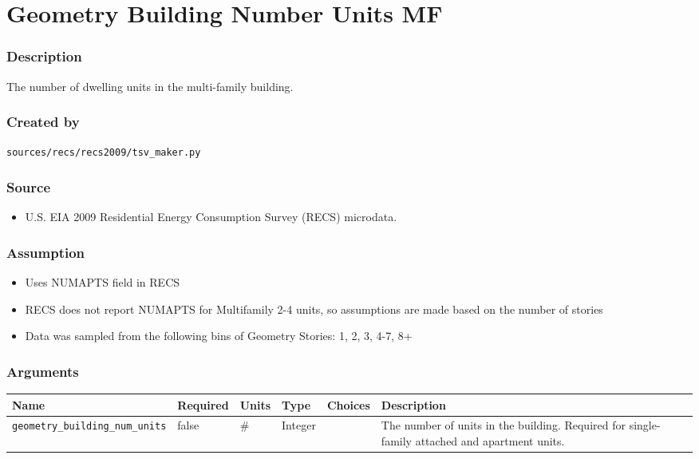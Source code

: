 \section{Geometry Building Number Units
MF}\label{geometry_building_number_units_mf}

\subsubsection{Description}\label{description-47}

The number of dwelling units in the multi-family building.

\subsubsection{Created by}\label{created-by-47}

\texttt{sources/recs/recs2009/tsv\_maker.py}

\subsubsection{Source}\label{source-46}

\begin{itemize}
 
\item
  U.S. EIA 2009 Residential Energy Consumption Survey (RECS) microdata.
\end{itemize}

\subsubsection{Assumption}\label{assumption-26}

\begin{itemize}
 
\item
  Uses NUMAPTS field in RECS
\item
  RECS does not report NUMAPTS for Multifamily 2-4 units, so assumptions
  are made based on the number of stories
\item
  Data was sampled from the following bins of Geometry Stories: 1, 2, 3,
  4-7, 8+
\end{itemize}

\subsubsection{Arguments}\label{arguments-31}

\begin{longtable}[]{@{}llllll@{}}
\toprule\noalign{}
Name & Required & Units & Type & Choices & Description \\
\midrule\noalign{}
\endhead
\bottomrule\noalign{}
\endlastfoot
\texttt{geometry\_building\_num\_units} & false & \# & Integer & & The
number of units in the building. Required for single-family attached and
apartment units. \\
\end{longtable}

